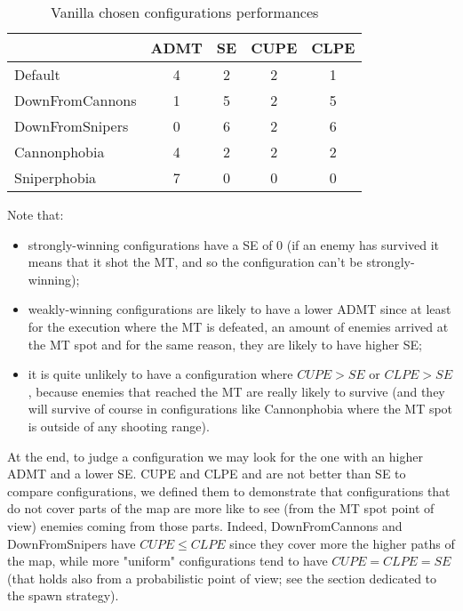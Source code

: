 \documentclass[
10pt, %
a4paper, %
oneside, %
headinclude,footinclude, %
BCOR5mm, %
]{scrartcl}
\begin{document}
			\begin{table}[h!]
				\centering
				\begin{tabular}{||l|c|c|c|c||}
					\hline
					& ADMT & SE & CUPE & CLPE \\
					\hline
					Default 		& 4 & 2 & 2 & 1 \\ \hline
					DownFromCannons & 1 & 5 & 2 & 5 \\ \hline
					DownFromSnipers & 0 & 6 & 2 & 6 \\ \hline
					Cannonphobia 	& 4 & 2 & 2 & 2 \\ \hline
					Sniperphobia 	& 7 & 0 & 0 & 0 \\ \hline
				\end{tabular}
				\caption{Vanilla chosen configurations performances}
			\end{table}
			Note that:
			\begin{itemize}
				\item strongly-winning configurations have a SE of 0 (if an enemy has survived it means that it shot the MT, and so the configuration can't be strongly-winning);
				\item weakly-winning configurations are likely to have a lower ADMT since at least for the execution where the MT is defeated, an amount of enemies arrived at the MT spot and for the same reason, they are likely to have higher SE;
				\item it is quite unlikely to have a configuration where $CUPE>SE$ or $CLPE>SE$, because enemies that reached the MT are really likely to survive (and they will survive of course in configurations like Cannonphobia where the MT spot is outside of any shooting range).
			\end{itemize}
			At the end, to judge a configuration we may look for the one with an higher ADMT and a lower SE. CUPE and CLPE and are not better than SE to compare configurations, we defined them to demonstrate that configurations that do not cover parts of the map are more like to see (from the MT spot point of view) enemies coming from those parts. Indeed, DownFromCannons and DownFromSnipers have $CUPE\leq CLPE$ since they cover more the higher paths of the map, while more "uniform" configurations tend to have $CUPE=CLPE=SE$ (that holds also from a probabilistic point of view; see the section dedicated to the spawn strategy).
\end{document}
